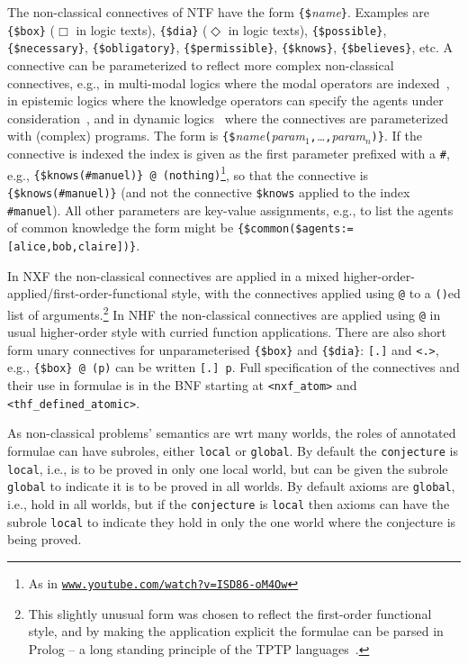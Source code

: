 \documentclass{ceurart}
\begin{document}
The non-classical connectives of NTF have the form {\tt \{\$}{\em name}{\tt \}}.
Examples are {\tt \{\$box\}} ($\Box$ in logic texts), {\tt \{\$dia\}} ($\Diamond$ in logic texts), 
{\tt \{\$possible\}}, {\tt \{\$necessary\}}, {\tt \{\$obligatory\}}, {\tt \{\$permissible\}}, 
{\tt \{\$knows\}}, {\tt \{\$believes\}}, etc.
A connective can be parameterized to reflect more complex non-classical connectives, e.g., in 
multi-modal logics where the modal operators are indexed~\cite{Bal98}, in epistemic logics where 
the knowledge operators can specify the agents under consideration~\cite{vDH15}, and in dynamic 
logics~\cite{HKT00} where the connectives are parameterized with (complex) programs.
The form is
{\tt \{\$}{\em name}{\tt (}{\em param$_1$}{\tt ,}{\em \ldots}{\tt ,}{\em param$_n$}{\tt )}{\tt \}}.
If the connective is indexed the index is given as the first parameter prefixed with a {\tt \#},
e.g., {\tt \{\$knows(\#manuel)\}\,@\,(nothing)}\footnote{%
As in \href{https://www.youtube.com/watch?v=ISD86-oM4Ow}{\tt www.youtube.com/watch?v=ISD86-oM4Ow}},
so that the connective is {\tt \{\$knows(\#manuel)\}} (and not the connective {\tt \$knows} applied
to the index {\tt \#manuel}).
All other parameters are key-value assignments, e.g., to list the agents of common knowledge the
form might be {\tt \{\$common(\$agents:=[alice,bob,claire])\}}.

In NXF the non-classical connectives are applied in a mixed 
higher-order-applied/first-order-functional style, with the connectives applied using {\tt @}
to a {\tt ()}ed list of arguments.\footnote{%
This slightly unusual form was chosen to reflect the first-order functional style, and by making
the application explicit the formulae can be parsed in Prolog -- a long standing principle of the
TPTP languages~\cite{SZS04}.}
In NHF the non-classical connectives are applied using {\tt @} in usual higher-order style with 
curried function applications.
There are also short form unary connectives for unparameterised {\tt \{\$box\}} and 
{\tt \{\$dia\}}: {\tt [.]} and {\tt <.>}, e.g., {\tt \{\$box\}\,@\,(p)} can be written {\tt [.]\,p}.
Full specification of the connectives and their use in formulae is in the BNF
starting at {\tt <nxf\_atom>} and {\tt <thf\_defined\_atomic>}.

As non-classical problems' semantics are wrt many worlds, the roles of annotated formulae
can have subroles, either {\tt local} or {\tt global}.
By default the {\tt conjecture} is {\tt local}, i.e., is to be proved in only one local world, but
can be given the subrole {\tt global} to indicate it is to be proved in all worlds.
By default axioms are {\tt global}, i.e., hold in all worlds, but if the {\tt conjecture} is
{\tt local} then axioms can have the subrole {\tt local} to indicate they hold in only the one 
world where the conjecture is being proved.
\end{document}
